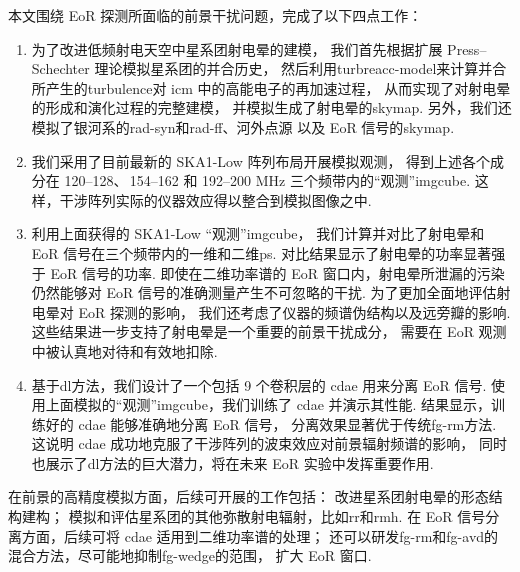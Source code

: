 
\begin{summary}

本文围绕 EoR 探测所面临的前景干扰问题，完成了以下四点工作：
\begin{enumerate}
\item
为了改进低频射电天空中星系团射电晕的建模，
我们首先根据扩展 Press--Schechter 理论模拟星系团的并合历史，
然后利用\ac{turbreacc-model}来计算并合所产生的\ac{turbulence}对 \ac{icm}
中的高能电子的再加速过程，
从而实现了对射电晕的形成和演化过程的完整建模，
并模拟生成了射电晕的\ac{skymap}.
另外，我们还模拟了银河系的\ac{rad-syn}和\ac{rad-ff}、河外点源
以及 EoR 信号的\ac{skymap}.

\item
我们采用了目前最新的 SKA1-Low 阵列布局开展模拟观测，
得到上述各个成分在 \numrange{120}{128}、\,\numrange{154}{162}
和 \numrange{192}{200} \si{\MHz} 三个频带内的\enquote{观测}\ac{imgcube}.
这样，干涉阵列实际的仪器效应得以整合到模拟图像之中.

\item
利用上面获得的 SKA1-Low \enquote{观测}\ac{imgcube}，
我们计算并对比了射电晕和 EoR 信号在三个频带内的一维和二维\ac{ps}.
对比结果显示了射电晕的功率显著强于 EoR 信号的功率.
即使在二维功率谱的 EoR 窗口内，射电晕所泄漏的污染仍然能够对
EoR 信号的准确测量产生不可忽略的干扰.
为了更加全面地评估射电晕对 EoR 探测的影响，
我们还考虑了仪器的频谱伪结构以及远旁瓣的影响.
这些结果进一步支持了射电晕是一个重要的前景干扰成分，
需要在 EoR 观测中被认真地对待和有效地扣除.

\item
基于\ac{dl}方法，我们设计了一个包括 9 个卷积层的 \ac{cdae} 用来分离 EoR 信号.
使用上面模拟的\enquote{观测}\ac{imgcube}，我们训练了 \ac{cdae} 并演示其性能.
结果显示，训练好的 \ac{cdae} 能够准确地分离 EoR 信号，
分离效果显著优于传统\ac{fg-rm}方法.
这说明 \ac{cdae} 成功地克服了干涉阵列的波束效应对前景辐射频谱的影响，
同时也展示了\ac{dl}方法的巨大潜力，将在未来 EoR 实验中发挥重要作用.
\end{enumerate}

在前景的高精度模拟方面，后续可开展的工作包括：
改进星系团射电晕的形态结构建构；
模拟和评估星系团的其他弥散射电辐射，比如\ac{rr}和\ac{rmh}.
在 EoR 信号分离方面，后续可将 \ac{cdae} 适用到二维功率谱的处理；
还可以研发\ac{fg-rm}和\ac{fg-avd}的混合方法，尽可能地抑制\ac{fg-wedge}的范围，
扩大 EoR 窗口.

\end{summary}
